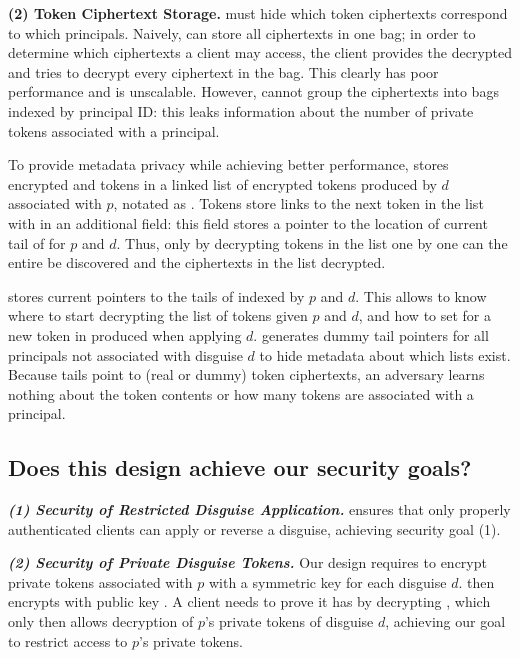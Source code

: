\vspace{6pt}\noindent\textbf{(2) Token Ciphertext Storage.}
\sys must hide which token ciphertexts correspond to which principals.  Naively, \sys can store
all ciphertexts in one bag; in order to determine which ciphertexts a client may access, the client
provides the decrypted  and \sys tries to decrypt every ciphertext in the bag. This clearly
has poor performance and is unscalable.
However, \sys cannot group the ciphertexts into bags indexed by principal ID: this leaks information
about the number of private tokens associated with a principal.

To provide metadata privacy while achieving better performance, \sys stores encrypted  and
 tokens in a linked list of encrypted tokens produced by $d$ associated with $p$, notated
as . 
Tokens store links to the next token in the list with in an additional  field: this
field stores a pointer to the location of current tail of  for $p$ and $d$.
Thus, only by decrypting tokens in the list one by one can the entire  be discovered and
the ciphertexts in the list decrypted.

\sys stores current pointers to the tails of  indexed by $p$ and $d$. This allows \sys to
know where to start decrypting the list of tokens given $p$ and $d$, and how to set
 for a new token in  produced when applying $d$. \sys generates dummy
tail pointers for all principals not associated with disguise $d$ to hide metadata about which lists
exist.
Because  tails point to (real or dummy) token ciphertexts, an adversary learns nothing
about the token contents or how many tokens are associated with a principal.

\subsection{Does this design achieve our security goals?}
\label{sec:achievegoals}
\vspace{6pt}\noindent\textbf{\emph{(1) Security of Restricted Disguise Application.}}
\sys ensures that only properly authenticated clients can apply or
reverse a disguise, achieving security goal (1).

\vspace{6pt}\noindent\textbf{\emph{(2) Security of Private Disguise Tokens.}}
Our design requires \sys to encrypt private tokens associated with $p$ with a symmetric key
 for each disguise $d$. \sys then encrypts  with public key .  
A client needs to prove it has  by decrypting , which only then allows decryption
of $p$'s private tokens of disguise $d$, achieving our goal to restrict access to $p$'s private
tokens.


